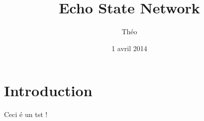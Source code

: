 \documentclass{article}
\title{Echo State Network}
\author{Th\'eo \bsc{Biasutto--Lervat}}
\date{1 avril 2014}
\begin{document}
\maketitle

\section{Introduction}
Ceci é un tst !
\section{}
\end{document}

